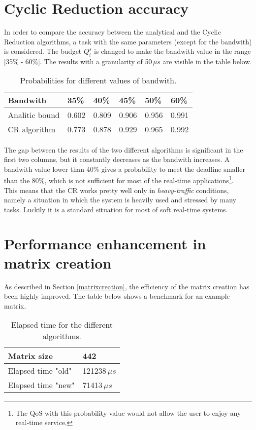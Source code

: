 \section{Cyclic Reduction accuracy} \label{craccuracy}
In order to compare the accuracy between the analytical and the Cyclic Reduction algorithms, a task with the same parameters (except for the bandwith) is considered. The budget \( Q_{i}^{s} \) is changed to make the bandwith value in the range [35\% - 60\%]. The results with a granularity of 50\,\( \mu{s} \) are visible in the table below.
\begin{table}[H]
\label{comparison}
\begin{center}
\begin{tabular}{| l | l | l | l | l | l |}
  \hline
  Bandwith & 35\% & 40\% & 45\% & 50\% & 60\% \\ \hline
  Analitic bound & 0.602 & 0.809 & 0.906 & 0.956 & 0.991 \\
  CR algorithm & 0.773 & 0.878 & 0.929 & 0.965 & 0.992 \\ \hline
\end{tabular}
\caption[]{Probabilities for different values of bandwith\footnotemark[2].}
\end{center} 
\end{table}


The gap between the results of the two different algorithms is significant in the first two columns, but it constantly decreases as the bandwith increases. A bandwith value lower than 40\% gives a probability to meet the deadline smaller than the 80\%, which is not sufficient for most of the real-time applications\footnote[3]{The QoS with this probability value would not allow the user to enjoy any real-time service.}.\\
This means that the CR works pretty well only in \emph{heavy-traffic} conditions, namely a situation in which the system is heavily used and stressed by many tasks. Luckily it is a standard situation for most of soft real-time systems.  

\section{Performance enhancement in matrix creation} \label{matrixperformance}
As described in Section \ref{matrixcreation}, the efficiency of the matrix creation has been highly improved. The table below shows a benchmark for an example matrix.
\begin{table}[H]
\label{benchmark}
\begin{center}
\begin{tabular}{| l | l |}
  \hline
  Matrix size & 442 \\ \hline
  Elapsed time "old" & 121238\( \,\mu{s} \) \\ \hline
  Elapsed time "new" & 71413\( \,\mu{s} \) \\ \hline
\end{tabular}
\caption[]{Elapsed time for the different algorithms\footnotemark[2].}
\end{center}
\end{table}


